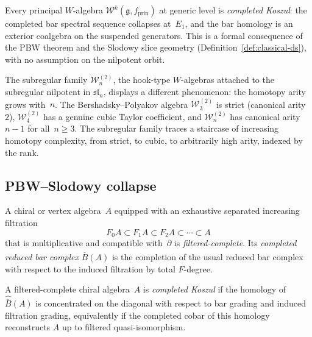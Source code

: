 Every principal $W$-algebra $\mathcal{W}^k(\mathfrak{g},
f_{\mathrm{prin}})$ at generic level is \emph{completed Koszul}: the
completed bar spectral sequence collapses at~$E_1$, and the bar
homology is an exterior coalgebra on the suspended generators.  This
is a formal consequence of the PBW theorem and the Slodowy slice
geometry (Definition~\ref{def:classical-ds}), with no assumption on
the nilpotent orbit.

The subregular family $\mathcal{W}_n^{(2)}$, the hook-type
$W$-algebras attached to the subregular nilpotent in
$\mathfrak{sl}_n$, displays a different phenomenon: the homotopy
arity grows with~$n$.  The Bershadsky--Polyakov algebra
$\mathcal{W}_3^{(2)}$ is strict (canonical arity~$2$),
$\mathcal{W}_4^{(2)}$ has a genuine cubic Taylor coefficient, and
$\mathcal{W}_n^{(2)}$ has canonical arity~$n-1$ for all~$n \ge 3$.
The subregular family traces a staircase of increasing homotopy
complexity, from strict, to cubic, to arbitrarily high arity,
indexed by the rank.

\subsection{PBW--Slodowy collapse}
\label{subsec:pbw-slodowy-collapse}

\begin{definition}
\label{def:w-filtered-complete-chiral}
A chiral or vertex algebra~$A$ equipped with an exhaustive separated
increasing filtration
\[
F_0A \subset F_1A \subset F_2A \subset \cdots \subset A
\]
that is multiplicative and compatible with~$\partial$ is
\emph{filtered-complete}.  Its \emph{completed reduced bar complex}
$\widehat{\overline{B}}(A)$ is the completion of the usual reduced
bar complex with respect to the induced filtration by total
$F$-degree.
\end{definition}

\begin{definition}
\label{def:w-completed-koszulity}
A filtered-complete chiral algebra~$A$ is \emph{completed Koszul} if
the homology of $\widehat{\overline{B}}(A)$ is concentrated on the
diagonal with respect to bar grading and induced filtration grading,
equivalently if the completed cobar of this homology reconstructs $A$
up to filtered quasi-isomorphism.
\end{definition}

